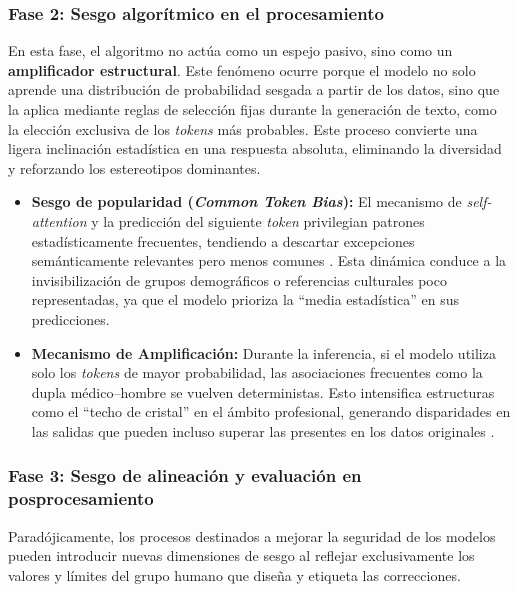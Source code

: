 \documentclass[12pt,a4paper]{report}
\begin{document}
\subsubsection*{Fase 2: Sesgo algorítmico en el procesamiento}

En esta fase, el algoritmo no actúa como un espejo pasivo, sino como un \textbf{amplificador estructural}. Este fenómeno ocurre porque el modelo no solo aprende una distribución de probabilidad sesgada a partir de los datos, sino que la aplica mediante reglas de selección fijas durante la generación de texto, como la elección exclusiva de los \textit{tokens} más probables. Este proceso convierte una ligera inclinación estadística en una respuesta absoluta, eliminando la diversidad y reforzando los estereotipos dominantes.

\begin{itemize}
    \item \textbf{Sesgo de popularidad (\textit{Common Token Bias}):} El mecanismo de \textit{self-attention} y la predicción del siguiente \textit{token} privilegian patrones estadísticamente frecuentes, tendiendo a descartar excepciones semánticamente relevantes pero menos comunes \cite{weidinger_taxonomy_2022}. Esta dinámica conduce a la invisibilización de grupos demográficos o referencias culturales poco representadas, ya que el modelo prioriza la ``media estadística'' en sus predicciones.
    
    \item \textbf{Mecanismo de Amplificación:} Durante la inferencia, si el modelo utiliza solo los \textit{tokens} de mayor probabilidad, las asociaciones frecuentes como la dupla médico--hombre se vuelven deterministas. Esto intensifica estructuras como el ``techo de cristal'' en el ámbito profesional, generando disparidades en las salidas que pueden incluso superar las presentes en los datos originales \cite{shah_comprehensive_2025, gupta_understanding_2025}.
\end{itemize}

\subsubsection*{Fase 3: Sesgo de alineación y evaluación en posprocesamiento}
Paradójicamente, los procesos destinados a mejorar la seguridad de los modelos pueden introducir nuevas dimensiones de sesgo al reflejar exclusivamente los valores y límites del grupo humano que diseña y etiqueta las correcciones.
\end{document}
